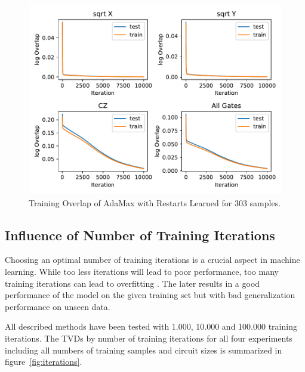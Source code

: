 \begin{figure}[H]
  \centering
  \includegraphics[width=\textwidth]{figures/results/AM-restarts-learned/avgOverlap_303.pdf}
  \caption[Training Overlap of AdaMax with Restarts Learned]{Training 
  Overlap of AdaMax with Restarts Learned for 303 samples.}
  \label{fig:sr_tvd}
\end{figure}

\iffalse
\subsection{Influence of Number of Training Iterations}
Choosing an optimal number of training iterations is a crucial aspect in machine learning.
While too less iterations will lead to poor performance, too many training iterations can lead 
to overfitting \cite{}. The later results in a good performance of the model on the given 
training set but with bad generalization performance on unseen data. 

All described methods have been tested with 1.000, 10.000 and 100.000 training iterations. 
The TVDs by number of training iterations for all four experiments including all numbers 
of training samples and circuit sizes is summarized in figure~\ref{fig:iterations}.

